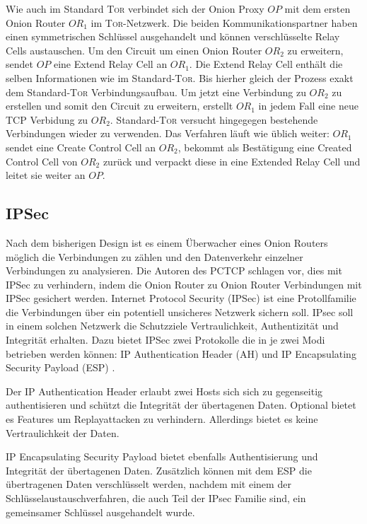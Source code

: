 \documentclass[fleqn,envcountsame,runningheads,10pt,a4paper]{llncs}
\begin{document}
Wie auch im Standard \textsc{Tor} verbindet sich der Onion Proxy $\textit{OP}$ mit dem ersten Onion Router $\textit{OR}_1$ im \textsc{Tor}-Netzwerk. Die beiden Kommunikationspartner haben einen symmetrischen Schlüssel ausgehandelt und können verschlüsselte Relay Cells austauschen. Um den Circuit um einen Onion Router $\textit{OR}_2$ zu erweitern, sendet $\textit{OP}$ eine Extend Relay Cell an $\textit{OR}_1$. Die Extend Relay Cell enthält die selben Informationen wie im Standard-\textsc{Tor}. Bis hierher gleich der Prozess exakt dem Standard-\textsc{Tor} Verbindungsaufbau. Um jetzt eine Verbindung zu $\textit{OR}_2$ zu erstellen und somit den Circuit zu erweitern, erstellt $\textit{OR}_1$ in jedem Fall eine neue TCP Verbidung zu $\textit{OR}_2$. Standard-\textsc{Tor} versucht hingegegen bestehende Verbindungen wieder zu verwenden. Das Verfahren läuft wie üblich weiter: $\textit{OR}_1$ sendet eine Create Control Cell an $\textit{OR}_2$, bekommt als Bestätigung eine Created Control Cell von $\textit{OR}_2$ zurück und verpackt diese in eine Extended Relay Cell und leitet sie weiter an $\textit{OP}$.

\subsection{IPSec}

Nach dem bisherigen Design ist es einem Überwacher eines Onion Routers möglich die Verbindungen zu zählen und den Datenverkehr einzelner Verbindungen zu analysieren. Die Autoren des PCTCP schlagen vor, dies mit IPSec zu verhindern, indem die Onion Router zu Onion Router Verbindungen mit IPSec gesichert werden. Internet Protocol Security (IPSec) ist eine Protollfamilie die Verbindungen über ein potentiell unsicheres Netzwerk sichern soll.
IPsec soll in einem solchen Netzwerk die Schutzziele Vertraulichkeit, Authentizität und Integrität erhalten. Dazu bietet IPSec zwei Protokolle die in je zwei Modi betrieben werden können: IP Authentication Header (AH) \cite{rfc:ah} und IP Encapsulating Security Payload (ESP) \cite{rfc:esp}.

Der IP Authentication Header erlaubt zwei Hosts sich sich zu gegenseitig authentisieren und schützt die Integrität der übertagenen Daten. Optional bietet es Features um Replayattacken zu verhindern. Allerdings bietet es keine Vertraulichkeit der Daten.

IP Encapsulating Security Payload bietet ebenfalls Authentisierung und Integrität der übertagenen Daten. Zusätzlich können mit dem ESP die übertragenen Daten verschlüsselt werden, nachdem mit einem der Schlüsselaustauschverfahren, die auch Teil der IPsec Familie sind, ein gemeinsamer Schlüssel ausgehandelt wurde.
\end{document}
